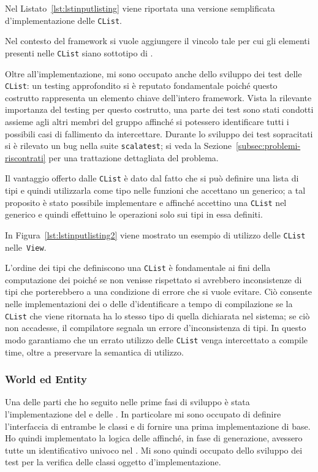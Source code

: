 Nel Listato~\ref{lst:lstinputlisting} viene riportata una versione semplificata d'implementazione delle \texttt{CList}.


Nel contesto del framework si vuole aggiungere il vincolo tale per cui gli elementi presenti nelle \texttt{CList} siano
sottotipo di \Component.

Oltre all'implementazione, mi sono occupato anche dello sviluppo dei test delle \texttt{CList}: un testing approfondito
si è reputato fondamentale poiché questo costrutto rappresenta un elemento chiave dell'intero framework.
Vista la rilevante importanza del testing per questo costrutto, una parte dei test sono stati condotti assieme agli
altri membri del gruppo affinché si potessero identificare tutti i possibili casi di fallimento da intercettare.
Durante lo sviluppo dei test sopracitati si è rilevato un bug nella suite \texttt{scalatest}; si veda la
Sezione~\ref{subsec:problemi-riscontrati} per una trattazione dettagliata del problema.

Il vantaggio offerto dalle \texttt{CList} è dato dal fatto che si può definire una lista di tipi e quindi utilizzarla
come tipo nelle funzioni che accettano un generico;
a tal proposito è stato possibile implementare \System e \View affinché accettino una \texttt{CList} nel
generico e quindi effettuino le operazioni solo sui tipi in essa definiti.

In Figura~\ref{lst:lstinputlisting2} viene mostrato un esempio di utilizzo delle \texttt{CList} nelle~\texttt{View}.


L'ordine dei tipi che definiscono una \texttt{CList} è fondamentale ai fini della computazione dei \System poiché se non
venisse rispettato si avrebbero inconsistenze di tipi che porterebbero a una condizione di errore che si vuole evitare.
Ciò consente nelle implementazioni dei \System o delle \View d'identificare a tempo di compilazione se la
\texttt{CList} che viene ritornata ha lo stesso tipo di quella dichiarata nel sistema;
se ciò non accadesse, il compilatore segnala un errore d'inconsistenza di tipi.
In questo modo garantiamo che un errato utilizzo delle \texttt{CList} venga intercettato a compile time, oltre a
preservare la semantica di utilizzo.

\subsubsection{World ed Entity}
Una delle parti che ho seguito nelle prime fasi di sviluppo è stata l'implementazione del \World e delle \Entity.
In particolare mi sono occupato di definire l'interfaccia di entrambe le classi e di fornire una prima implementazione
di base.
Ho quindi implementato la logica delle \Entity affinché, in fase di generazione, avessero tutte un identificativo
univoco nel \World.
Mi sono quindi occupato dello sviluppo dei test per la verifica delle classi oggetto d'implementazione.

